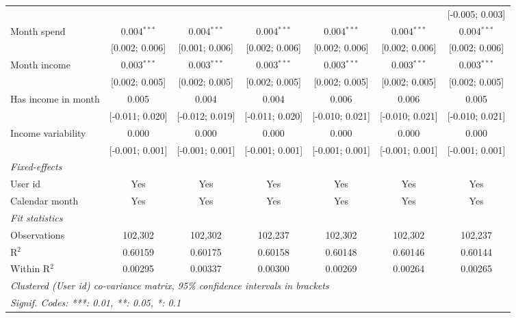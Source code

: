 \begin{table}[htbp]
\begin{threeparttable}[b]
\begin{tabular}{lcccccc}
                                    &                 &                 &                 &                 &                 & [-0.005; 0.003]\\   
         Month spend                & 0.004$^{***}$   & 0.004$^{***}$   & 0.004$^{***}$   & 0.004$^{***}$   & 0.004$^{***}$   & 0.004$^{***}$\\   
                                    & [0.002; 0.006]  & [0.001; 0.006]  & [0.002; 0.006]  & [0.002; 0.006]  & [0.002; 0.006]  & [0.002; 0.006]\\   
         Month income               & 0.003$^{***}$   & 0.003$^{***}$   & 0.003$^{***}$   & 0.003$^{***}$   & 0.003$^{***}$   & 0.003$^{***}$\\   
                                    & [0.002; 0.005]  & [0.002; 0.005]  & [0.002; 0.005]  & [0.002; 0.005]  & [0.002; 0.005]  & [0.002; 0.005]\\   
         Has income in month        & 0.005           & 0.004           & 0.004           & 0.006           & 0.006           & 0.005\\   
                                    & [-0.011; 0.020] & [-0.012; 0.019] & [-0.011; 0.020] & [-0.010; 0.021] & [-0.010; 0.021] & [-0.010; 0.021]\\   
         Income variability         & 0.000           & 0.000           & 0.000           & 0.000           & 0.000           & 0.000\\   
                                    & [-0.001; 0.001] & [-0.001; 0.001] & [-0.001; 0.001] & [-0.001; 0.001] & [-0.001; 0.001] & [-0.001; 0.001]\\   
         \midrule
         \emph{Fixed-effects}\\
         User id                    & Yes             & Yes             & Yes             & Yes             & Yes             & Yes\\  
         Calendar month             & Yes             & Yes             & Yes             & Yes             & Yes             & Yes\\  
         \midrule
         \emph{Fit statistics}\\
         Observations               & 102,302         & 102,302         & 102,237         & 102,302         & 102,302         & 102,237\\  
         R$^2$                      & 0.60159         & 0.60175         & 0.60158         & 0.60148         & 0.60146         & 0.60144\\  
         Within R$^2$               & 0.00295         & 0.00337         & 0.00300         & 0.00269         & 0.00264         & 0.00265\\  
         \midrule \midrule
         \multicolumn{7}{l}{\emph{Clustered (User id) co-variance matrix, 95\% confidence intervals in brackets}}\\
         \multicolumn{7}{l}{\emph{Signif. Codes: ***: 0.01, **: 0.05, *: 0.1}}\\
      \end{tabular}
   \end{threeparttable}
\end{table}



